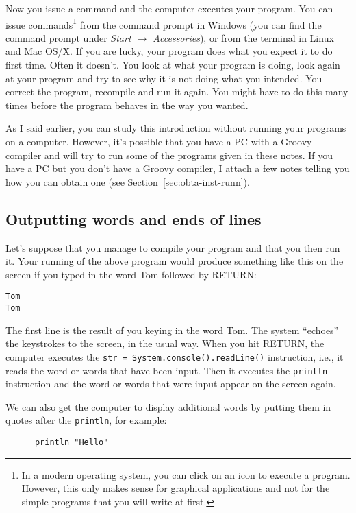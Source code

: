 Now you issue a command and the computer executes
your program. You can issue commands\footnote{In
    a modern operating system, you can click on an icon to execute a
    program. However, this only makes sense for graphical applications
    and not for the simple programs that you will write at first.}
from the command prompt in Windows (you can find the command prompt under 
\emph{Start $\rightarrow$
    Accessories}), or from the terminal in Linux and Mac OS/X.
If you are lucky, your program does what you expect it 
to do first time.  Often it doesn't.  You look at what your program is
doing, look again at your program and try to see why it is not doing what
you intended.  You correct the program, recompile and run it again.
You might have to do this many times before the program behaves in the way
you wanted.

As I said earlier, you can study this introduction without running your
programs on a computer.  However, it's possible that you have a PC with
a Groovy compiler and will try to run some of the programs given in these
notes. 
If you have a PC but you don't have a Groovy compiler, I attach a few notes telling
you how you can obtain one (see Section~\ref{sec:obta-inst-runn}).


\subsection{Outputting words and ends of lines}

Let's suppose that you manage to compile your program 
and that you then run it.  Your running of the above program
would produce something like this on the screen if you typed in
the word Tom followed by RETURN: 

\begin{Verbatim}
Tom
Tom
\end{Verbatim}

The first line is the result of you keying in the word Tom.  The system ``echoes''
the keystrokes to the screen, in the usual way.  When you hit RETURN, the
computer executes the \verb!str = System.console().readLine()! instruction, 
i.e., it reads the word or words that have been input.  Then it
executes the \verb!println! instruction and the word or words that were
input appear on the screen again.

We can also get the computer to display additional words by putting
them in quotes after the \verb!println!, for example:

\begin{Verbatim}
      println "Hello"
\end{Verbatim}

